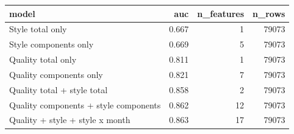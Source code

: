 \begin{tabular}{lrrr}
\toprule
model & auc & n_features & n_rows \\
\midrule
Style total only & 0.667 & 1 & 79073 \\
Style components only & 0.669 & 5 & 79073 \\
Quality total only & 0.811 & 1 & 79073 \\
Quality components only & 0.821 & 7 & 79073 \\
Quality total + style total & 0.858 & 2 & 79073 \\
Quality components + style components & 0.862 & 12 & 79073 \\
Quality + style + style x month & 0.863 & 17 & 79073 \\
\bottomrule
\end{tabular}
